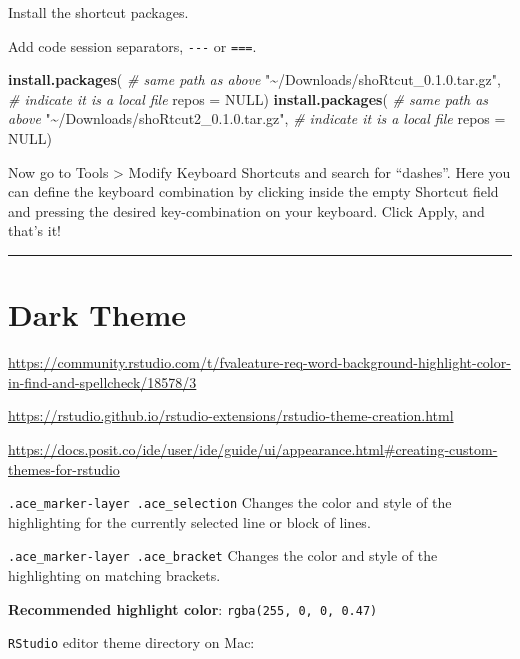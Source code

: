\documentclass[
]{book}
\newenvironment{Shaded}{\begin{snugshade}}{\end{snugshade}}
\newcommand{\AttributeTok}[1]{\textcolor[rgb]{0.13,0.29,0.53}{#1}}
\newcommand{\CommentTok}[1]{\textcolor[rgb]{0.56,0.35,0.01}{\textit{#1}}}
\newcommand{\ConstantTok}[1]{\textcolor[rgb]{0.56,0.35,0.01}{#1}}
\newcommand{\FunctionTok}[1]{\textcolor[rgb]{0.13,0.29,0.53}{\textbf{#1}}}
\newcommand{\NormalTok}[1]{#1}
\newcommand{\StringTok}[1]{\textcolor[rgb]{0.31,0.60,0.02}{#1}}
\begin{document}
Install the shortcut packages.

Add code session separators, \texttt{-\/-\/-} or \texttt{===}.

\begin{Shaded}
\begin{Highlighting}[]
\FunctionTok{install.packages}\NormalTok{(}
    \CommentTok{\# same path as above}
  \StringTok{"\textasciitilde{}/Downloads/shoRtcut\_0.1.0.tar.gz"}\NormalTok{, }
  \CommentTok{\# indicate it is a local file}
  \AttributeTok{repos =} \ConstantTok{NULL}\NormalTok{)}
\FunctionTok{install.packages}\NormalTok{(}
    \CommentTok{\# same path as above}
  \StringTok{"\textasciitilde{}/Downloads/shoRtcut2\_0.1.0.tar.gz"}\NormalTok{, }
  \CommentTok{\# indicate it is a local file}
  \AttributeTok{repos =} \ConstantTok{NULL}\NormalTok{)}
\end{Highlighting}
\end{Shaded}

Now go to Tools \textgreater{} Modify Keyboard Shortcuts and search for ``dashes''. Here you can define the keyboard combination by clicking inside the empty Shortcut field and pressing the desired key-combination on your keyboard. Click Apply, and that's it!

\begin{center}\rule{0.5\linewidth}{0.5pt}\end{center}

\section{Dark Theme}\label{dark-theme}

\url{https://community.rstudio.com/t/fvaleature-req-word-background-highlight-color-in-find-and-spellcheck/18578/3}

\url{https://rstudio.github.io/rstudio-extensions/rstudio-theme-creation.html}

\url{https://docs.posit.co/ide/user/ide/guide/ui/appearance.html\#creating-custom-themes-for-rstudio}

\texttt{.ace\_marker-layer\ .ace\_selection} Changes the color and style of the highlighting for the currently selected line or block of lines.

\texttt{.ace\_marker-layer\ .ace\_bracket} Changes the color and style of the highlighting on matching brackets.

\textbf{Recommended highlight color}: \texttt{rgba(255,\ 0,\ 0,\ 0.47)}

\texttt{RStudio} editor theme directory on Mac:
\end{document}
